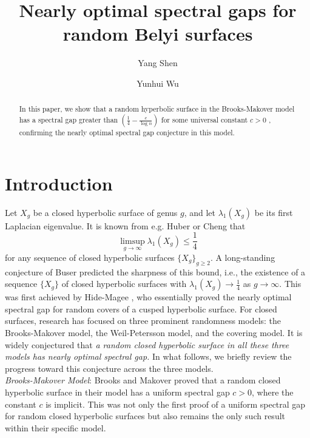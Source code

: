 \documentclass{amsart}
\theoremstyle{plain}
\theoremstyle{definition}
\theoremstyle{remark}
\begin{document}
\title[Nearly optimal spectral gaps]{Nearly optimal spectral gaps for random Belyi surfaces}

\author{Yang Shen}
\address{
Fudan University, Shanghai, China}

\author{Yunhui Wu}
\address{Tsinghua University, Beijing, China}



\maketitle
\begin{abstract}
In this paper, we show that a random hyperbolic surface in the Brooks-Makover model has a spectral gap greater than $\left(\frac{1}{4}-\frac{c}{\log n}\right)$ for some universal constant $c>0$ , confirming the nearly optimal spectral gap conjecture in this model.
\end{abstract}

\section{Introduction}
Let $X_g$ be a closed hyperbolic surface of genus $g$, and let $\lambda_1(X_g)$ be its first Laplacian eigenvalue. It is known from e.g. Huber \cite{Huber74} or Cheng \cite{Cheng75} that 
$$\limsup\limits_{g\to\infty}\lambda_1(X_g)\leq\frac{1}{4}$$
for any sequence of closed hyperbolic surfaces $\{X_g\}_{g\geq 2}$. A long-standing conjecture of Buser \cite{Buser84} predicted the sharpness of this bound, i.e., the existence of a sequence $\{X_g\}$ of closed hyperbolic surfaces with $\lambda_1(X_g)\to \frac{1}{4}$ as $g\to \infty$. This was first achieved by Hide-Magee \cite{HM23}, who essentially proved the nearly optimal spectral gap for random covers of a cusped hyperbolic surface. For closed surfaces, research has focused on three prominent randomness models: the Brooks-Makover model, the Weil-Petersson model, and the covering model. It is widely conjectured that \emph{a random closed hyperbolic surface in all these three models has nearly optimal spectral gap.} In what follows, we briefly review the progress toward this conjecture across the three models.\\

\noindent \emph{Brooks-Makover Model}: Brooks and Makover \cite{BM04} proved that a random closed hyperbolic surface in their model has a uniform spectral gap $c>0$, where the constant $c$ is implicit. This was not only the first proof of a uniform spectral gap for random closed hyperbolic surfaces but also remains the only such result within their specific model.\\
\end{document}
